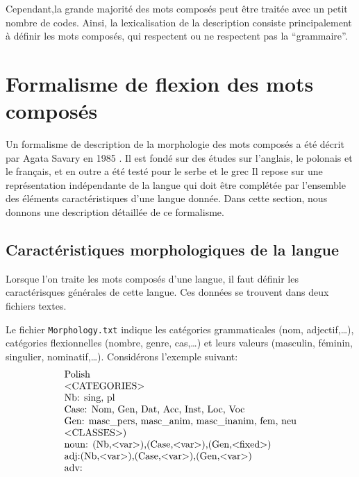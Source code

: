 \bigskip
\noindent Cependant,la grande majorité des mots composés peut être traitée avec un petit nombre de codes. Ainsi, la lexicalisation de la
description consiste principalement à définir les mots composés, qui respectent ou ne respectent pas
la  ``grammaire''.

\section{Formalisme de flexion des mots composés}
\label{section:formalism}
Un formalisme de description de la morphologie des mots composés a été décrit par Agata Savary en
1985 \cite{Savary05}. Il est fondé sur des études sur l'anglais, le polonais et le français, et
en outre a été testé pour le serbe \cite{Krstevetal06} et le grec%
Il repose sur une représentation indépendante de la langue qui doit être complétée par l'ensemble des éléments caractéristiques 
d'une langue donnée. Dans cette section, nous donnons une description détaillée de ce formalisme.

\subsection{Caractéristiques morphologiques de la langue}
\label{subsec:langfeat}
Lorsque l'on traite les mots composés d'une langue, il faut définir les caractérisques générales
de cette langue. Ces données se trouvent dans deux fichiers textes.

\bigskip
\noindent Le fichier \verb+Morphology.txt+  indique les catégories grammaticales
(nom, adjectif,\dots), catégories flexionnelles (nombre, genre, cas,\dots) et leurs valeurs 
(masculin, féminin, singulier, nominatif,\dots). Considérons l'exemple suivant:
\[
\begin{array}[c]{ll}
$Polish$ \\
$$<$CATEGORIES$>$$ \\
$Nb: sing, pl$ \\
$Case: Nom, Gen, Dat, Acc, Inst, Loc, Voc$ \\
$Gen: masc\_pers, masc\_anim, masc\_inanim, fem, neu$ \\
$$<$CLASSES$>$)$ \\
$noun: (Nb,$<$var$>$),(Case,$<$var$>$),(Gen,$<$fixed$>$)$ \\
$adj:(Nb,$<$var$>$),(Case,$<$var$>$),(Gen,$<$var$>$)$ \\
$adv:$
\end{array}
\]

